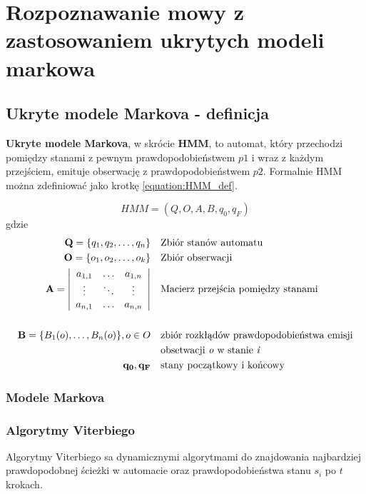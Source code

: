\documentclass[11pt]{article}
\begin{document}
\section {Rozpoznawanie mowy z zastosowaniem ukrytych modeli markowa}
	\label{sec:ASR_HMM}
    \subsection{Ukryte modele Markova - definicja}
    
	    \textbf{Ukryte modele Markova}, w skrócie \textbf{HMM}, to automat, który przechodzi pomiędzy stanami z pewnym prawdopodobieństwem $p1$ i wraz z każdym przejściem, emituje obserwację z prawdopodobieństwem $p2$. Formalnie HMM można zdefiniować jako krotkę \ref{equation:HMM_def}.
	    
	    \begin{equation}
		    HMM = (Q, O, A, B, q_0, q_F)
		    \label{equation:HMM_def}
	    \end{equation}
	    gdzie
	    \begin{align*}
		    \mathbf{Q}=\{q_1, q_2,\ldots,q_n\} & &&  \text{Zbiór stanów automatu} \\
	 	    \mathbf{O}=\{o_1, o_2,\ldots,o_k\} & &&  \text{Zbiór obserwacji} \\
	 	    \mathbf{A} =
	 	    \left| \begin{array}{ccc}
		 	    a_{1,1} & \ldots & a_{1,n} \\
		 	    \vdots  & \ddots & \vdots\\
		 	    a_{n,1} & \ldots & a_{n,n}
	 	    \end{array} \right|
												 	    & &&  \text{Macierz przejścia pomiędzy stanami} \\
												 	    & && \\
	 	    \mathbf{B}=\{B_1(o),\ldots,B_n(o)\},o \in O & && \text{zbiór rozkłądów prawdopodobieństwa emisji} \\ 
													 	& && \text{obsetwacji \textit{o} w stanie \textit{i}} \\
		 	\mathbf{q_0, q_F}				  & && \text{stany początkowy i końcowy}
	    \end{align*}
	    
    	
	    	
	   \subsubsection{Modele Markova}
	   \subsubsection{Algorytmy Viterbiego}
		   \label{sec:Viterbi}
		   Algorytmy Viterbiego sa dynamicznymi algorytmami do znajdowania najbardziej prawdopodobnej ścieżki w automacie oraz prawdopodobieństwa stanu $s_i$ po $t$ krokach. 
		   
\end{document}
